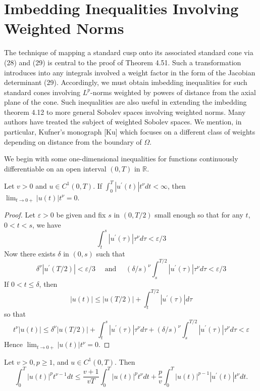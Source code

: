 \section{Imbedding Inequalities Involving Weighted Norms}


\begin{para}
  The technique of mapping a standard cusp onto its associated standard cone via (28) and (29) is central to the proof of Theorem 4.51. Such a transformation introduces into any integrals involved a weight factor in the form of the Jacobian determinant (29). Accordingly, we must obtain imbedding inequalities for such standard cones involving $L^p$-norms weighted by powers of distance from the axial plane of the cone. Such inequalities are also useful in extending the imbedding theorem 4.12 to more general Sobolev spaces involving weighted norms. Many authors have treated the subject of weighted Sobolev spaces. We mention, in
  particular, Kufner's monograph [Ku] which focuses on a different class of weights depending on distance from the boundary of $\Omega$.
\end{para}

We begin with some one-dimensional inequalities for functions continuously differentiable on an open interval $(0, T)$ in $\mathbb{R}$.


\begin{lemma}
  Let $v>0$ and $u \in C^1(0, T)$. If $\int_0^T\left|u^{\prime}(t)\right| t^\nu d t<\infty$, then $\lim _{t \rightarrow 0+}|u(t)| t^\nu=0$.
\end{lemma}

\begin{proof}
  Let $\varepsilon>0$ be given and fix $s$ in $(0, T / 2)$ small enough so that for any $t$, $0<t<s$, we have
  \[
  \int_t^s\left|u^{\prime}(\tau)\right| \tau^\nu d \tau<\varepsilon / 3
  \]
  Now there exists $\delta$ in $(0, s)$ such that
  \[
 \delta^\nu\left|u^{\prime}(T / 2)\right|<\varepsilon / 3 \quad \text { and } \quad(\delta / s)^\nu \int_s^{T / 2}\left|u^{\prime}(\tau)\right| \tau^\nu d \tau<\varepsilon / 3
  \]
  If $0<t \leq \delta$, then
  \[
  |u(t)| \leq|u(T / 2)|+\int_t^{T / 2}\left|u^{\prime}(\tau)\right| d \tau
  \]
  so that
  \[
  t^\nu|u(t)| \leq \delta^\nu|u(T / 2)|+\int_t^s\left|u^{\prime}(\tau)\right| \tau^\nu d \tau+(\delta / s)^\nu \int_s^{T / 2}\left|u^{\prime}(\tau)\right| \tau^\nu d \tau<\varepsilon
  \]
  Hence $\lim _{t \rightarrow 0+}|u(t)| t^\nu=0$.
\end{proof}


\begin{lemma}
  Let $v>0, p \geq 1$, and $u \in C^1(0, T)$. Then
  \[
  \int_0^T|u(t)|^p t^{\nu-1} d t \leq \frac{v+1}{v T} \int_0^T|u(t)|^p t^\nu d t+\frac{p}{v} \int_0^T|u(t)|^{p-1}\left|u^{\prime}(t)\right| t^\nu d t .
  \]
\end{lemma}

